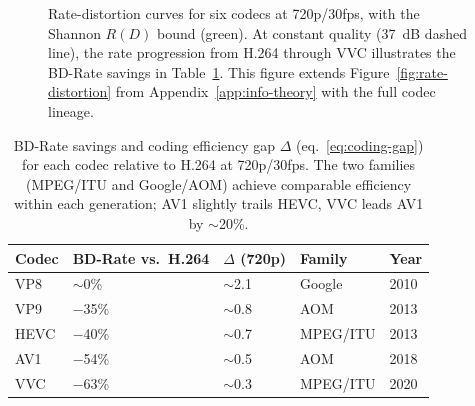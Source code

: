 \begin{figure}[ht]
\caption{Rate-distortion curves for six codecs at 720p/30fps, with the
  Shannon $R(D)$ bound (green). At constant quality (37~dB dashed line),
  the rate progression from H.264 through VVC illustrates the BD-Rate
  savings in Table~\ref{tab:bd-rate}. This figure extends
  Figure~\ref{fig:rate-distortion} from Appendix~\ref{app:info-theory}
  with the full codec lineage.}
\label{fig:rd-curves-detailed}
\end{figure}

\begin{table}[ht]
\centering
\small
\renewcommand{\arraystretch}{1.4}
\begin{tabularx}{\textwidth}{lXXXX}
\toprule
\textbf{Codec} & \textbf{BD-Rate vs.\ H.264}
  & \textbf{$\Delta$ (720p)} & \textbf{Family} & \textbf{Year} \\
\midrule
VP8  & ${\sim}$0\%    & ${\sim}$2.1 & Google    & 2010 \\
VP9  & $-$35\%        & ${\sim}$0.8 & AOM       & 2013 \\
HEVC & $-$40\%        & ${\sim}$0.7 & MPEG/ITU  & 2013 \\
AV1  & $-$54\%        & ${\sim}$0.5 & AOM       & 2018 \\
VVC  & $-$63\%        & ${\sim}$0.3 & MPEG/ITU  & 2020 \\
\bottomrule
\end{tabularx}
\caption{BD-Rate savings and coding efficiency gap $\Delta$
  (eq.~\ref{eq:coding-gap}) for each codec relative to H.264 at 720p/30fps.
  The two families (MPEG/ITU and Google/AOM) achieve comparable efficiency
  within each generation; AV1 slightly trails HEVC, VVC leads AV1 by
  ${\sim}$20\%.}
\label{tab:bd-rate}
\end{table}

